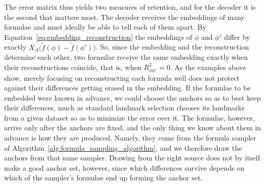\documentclass[titlepage,a4paper,11pt]{report}
\begin{document}
    The error matrix thus yields two measures of retention, and for the decoder it is the second that matters most. The decoder receives the embeddings of many formulae and must ideally be able to tell each of them apart. By Equation~\eqref{eq:embedding_reconstruction} the embeddings of $\phi$ and $\phi'$ differ by exactly $X_A\bigl(\tilde f(\phi)-\tilde f(\phi')\bigr)$. So, since the embedding and the reconstruction determine each other, two formulae receive the same embedding exactly when their reconstructions coincide, that is, when $R^2_{\phi\phi'}=0$. As the examples above show, merely focusing on reconstructing each formula well does not protect against their differences getting erased in the embedding. If the formulae to be embedded were known in advance, we could choose the anchors so as to best keep their differences, much as standard landmark selection chooses its landmarks from a given dataset so as to minimize the error over it. The formulae, however, arrive only after the anchors are fixed, and the only thing we know about them in advance is how they are produced. Namely, they come from the formula sampler of Algorithm~\ref{alg:formula_sampling_algorithm}, and we therefore draw the anchors from that same sampler. Drawing from the right source does not by itself make a good anchor set, however, since which differences survive depends on which of the sampler's formulae end up forming the anchor set.
\end{document}
